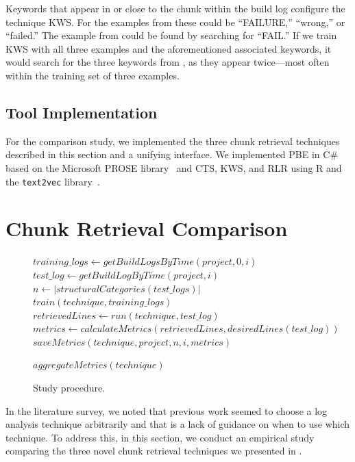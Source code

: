 Keywords that appear in or close to the chunk within
the build log configure the technique KWS\@.
For the examples from  these could be
``FAILURE,'' ``wrong,'' or ``failed.''
The example from  could be found
by searching for ``FAIL.''
If we train KWS with all three examples and the aforementioned
associated keywords, it would search for the three keywords from
, as they appear twice---most often within
the training set of three examples.

\subsection{Tool Implementation}
For the comparison study, we implemented the three chunk retrieval
techniques described in this section and a unifying interface.
We implemented PBE in C\# based on the Microsoft PROSE
library~\cite{prose2019webpage} and CTS, KWS, and RLR using
R and the {\tt text2vec} library~\cite{text2vec2019webpage}.

\section{Chunk Retrieval Comparison}
\label{sec:study}

\begin{figure}[tb]
\begin{algorithmic}[1]
   \State $training\_logs \gets getBuildLogsByTime(project, 0, i)$
   \State $test\_log \gets  getBuildLogByTime(project, i)$
   \State $n \gets |structuralCategories(test\_logs)|$
   \State
   \State $train(technique, training\_logs)$
       \State $retrievedLines \gets run(technique, test\_log)$
       \State $metrics \gets calculateMetrics(retrievedLines,
       desiredLines(test\_log))$
       \State
       \State $saveMetrics(technique, project, n, i, metrics)$

  \EndFor
 \EndFor
 \State $aggregateMetrics(technique)$
\EndFor
\end{algorithmic}

	\caption{Study procedure.}
	\label{fig:study}
\end{figure}


In the literature survey, we noted that previous work seemed to choose
a log analysis technique arbitrarily and that is a lack of guidance on
when to use which technique.
To address this, in this section, we conduct an empirical study
comparing the three novel chunk retrieval techniques we presented in
.

